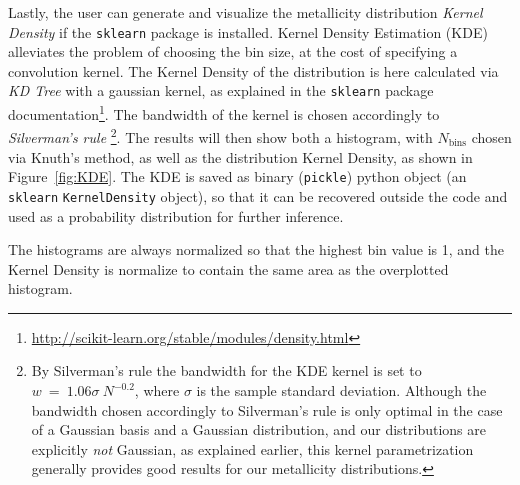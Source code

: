 \documentclass{emulateapj}
\begin{document}
Lastly, the user can generate and visualize the metallicity distribution \emph{Kernel Density} if the \verb=sklearn= package is installed. Kernel Density Estimation (KDE) alleviates the problem of choosing the bin size, at the cost of specifying a convolution kernel. The Kernel Density of the distribution is here calculated via \emph{KD Tree} with a gaussian kernel, as explained in the \verb=sklearn= package documentation\footnote{\url{http://scikit-learn.org/stable/modules/density.html}}. The bandwidth of the kernel is chosen accordingly to \emph{Silverman's rule} \citep{silverman86}\footnote{By Silverman's rule the bandwidth for the KDE kernel is set to $w~=~1.06\sigma~N^{-0.2}$, where $\sigma$ is the sample standard deviation. Although the bandwidth chosen accordingly to Silverman's rule is only optimal in the case of a Gaussian basis and a Gaussian distribution, and our distributions are explicitly \emph{not} Gaussian, as explained earlier, this kernel parametrization generally provides good results for our metallicity distributions.}. The results will then show both a histogram, with $N_\mathrm{bins}$ chosen via Knuth's method, as well as the distribution Kernel Density, as shown in Figure~\ref{fig:KDE}. The KDE is saved as binary (\verb=pickle=) python object (an \verb=sklearn= \verb=KernelDensity= object), so that it can be recovered outside the code and used as a probability distribution for further inference.

The histograms are always normalized so that the highest bin value is 1, and the  Kernel Density is normalize to contain the same area as the overplotted histogram. 
\end{document}

